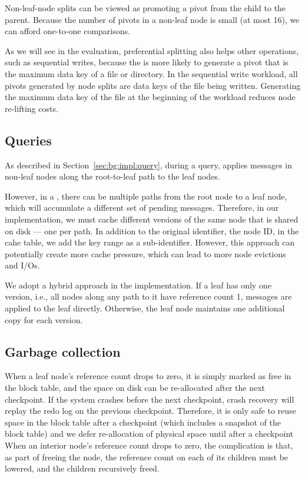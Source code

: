 Non-leaf-node splits can be viewed as promoting a pivot from the child to the
parent.
Because the number of pivots in a non-leaf node is small (at most 16), we can
afford one-to-one comparisons.

As we will see in the evaluation, preferential splitting also helps
other operations, such as sequential writes, because the \bet is more likely
to generate a pivot that is the maximum data key of a file or directory.
In the sequential write workload, all pivots generated by node splits are
data keys of the file being written.
Generating the maximum data key of the file at the beginning of the workload
reduces node re-lifting costs.

\subsection{Queries}

As described in Section~\ref{sec:bg:impl:query}, during a query,
\fti applies messages in non-leaf nodes along the root-to-leaf path to the
leaf nodes.

However, in a \bedag,
there can be multiple paths from the root node to a leaf node,
which will accumulate a different set of pending messages.
Therefore, in our implementation,
we must cache different versions of the same node that is shared on disk --- one per path.
In addition to the original identifier, the node ID, in the cahe table,
we add the key range as a sub-identifier.
However, this approach can potentially create more cache pressure,
which can lead to more node evictions and I/Os.

We adopt a hybrid approach in the implementation.
If a leaf has only one version, i.e., all nodes along any path to it have
reference count 1, messages are applied to the leaf directly.
Otherwise, the leaf node maintains one additional copy for each version.

\subsection{Garbage collection}

When a leaf node's reference count drops to zero,
it is simply marked as free in the block table,
and the space on disk can be re-allocated after the next checkpoint.
If the system crashes before the next checkpoint, crash recovery will replay the
redo log on the previous checkpoint.
Therefore, it is only safe to reuse space in the block table
after a checkpoint (which includes a snapshot of the block table)
and we defer re-allocation of physical space until after a checkpoint
When an interior node's reference count drops to zero, the complication
is that, as part of freeing the node, the reference count on each of its children
must be lowered, and the children recursively freed.

